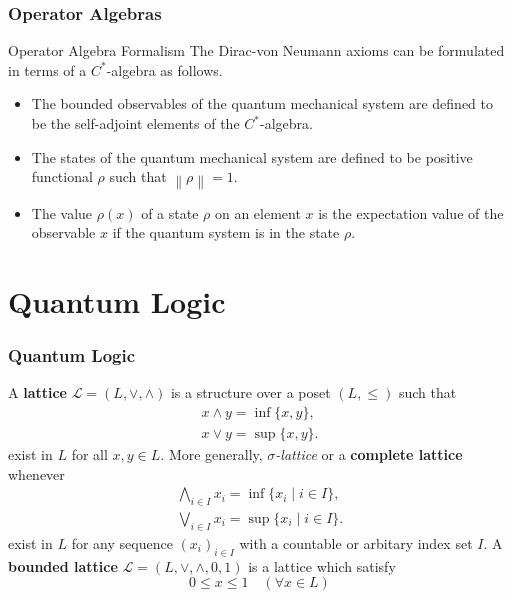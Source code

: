 \documentclass{beamer}
\begin{document}
    \begin{frame}
        \frametitle{Operator Algebras}
        \begin{block}{Operator Algebra Formalism}
            The Dirac-von Neumann axioms can be formulated in terms of a \(C^\ast\)-algebra as follows.
            \begin{itemize}
                \item The bounded observables of the quantum mechanical system are defined to be the self-adjoint elements of the \(C^\ast\)-algebra.
                \item The states of the quantum mechanical system are defined to be positive functional \(\rho\) such that \(\left \lVert \rho \right \rVert=1\).
                \item The value \(\rho(x)\) of a state \(\rho\) on an element \(x\) is the expectation value of the observable \(x\) if the quantum system is in the state \(\rho\).
            \end{itemize}
        \end{block}        
    \end{frame}


\section{Quantum Logic}

\begin{frame}
    \frametitle{Quantum Logic}
    A \textbf{lattice} \(\mathcal{L}=(L,\vee,\wedge)\) is a structure over a poset \((L,\le)\) such that
    \begin{gather*}
        x\wedge y = \inf \{x,y\}, \\
        x \vee y = \sup \{x,y\}.
    \end{gather*}
    exist in \(L\) for all \(x,y \in L\). More generally, \emph{\(\sigma\)-lattice} or a \textbf{complete lattice} whenever
    \begin{gather*}
        \bigwedge_{i\in I} x_i = \inf \{x_i \mid i \in I\}, \\
        \bigvee_{i\in I} x_i = \sup \{x_i \mid i \in I\}.
    \end{gather*}
    exist in \(L\) for any sequence \((x_i)_{i \in I}\) with a countable or arbitary index set \(I\). A \textbf{bounded lattice} \(\mathcal{L}=(L,\vee,\wedge,0,1)\) is a lattice which satisfy
    \[ 0 \le x \le 1 \quad (\forall x \in L) \]
\end{frame}
\end{document}
